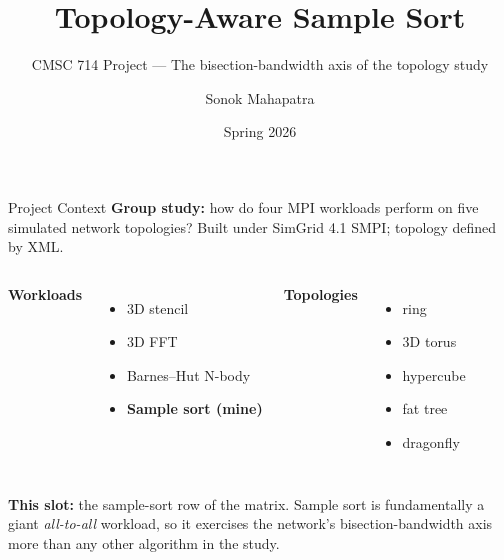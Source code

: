 \documentclass[10pt, aspectratio=169]{beamer}
\title[Topology-Aware Sample Sort]{Topology-Aware Sample Sort}
\subtitle{CMSC 714 Project --- The bisection-bandwidth axis of the topology study}
\author{Sonok Mahapatra}
\institute[UMD]{Group: J. LaGattuta, C. Dalziel, M. Wijitharathna, S. Mahapatra}
\date{Spring 2026}
\begin{document}
\frame{\titlepage}

\begin{frame}{Project Context}
\textbf{Group study:} how do four MPI workloads perform on five simulated
network topologies? Built under SimGrid 4.1 SMPI; topology defined by XML.

\vspace{0.5em}
\begin{columns}[T]
\textbf{Workloads}
\begin{itemize}
    \item 3D stencil
    \item 3D FFT
    \item Barnes--Hut N-body
    \item \textcolor{accentblue}{\textbf{Sample sort (mine)}}
\end{itemize}

\textbf{Topologies}
\begin{itemize}
    \item ring
    \item 3D torus
    \item hypercube
    \item fat tree
    \item dragonfly
\end{itemize}
\end{columns}

\vspace{0.8em}
\textbf{This slot:} the sample-sort row of the matrix.
Sample sort is fundamentally a giant \emph{all-to-all} workload, so it
exercises the network's \alert{bisection-bandwidth axis} more than any
other algorithm in the study.
\end{frame}
\end{document}
